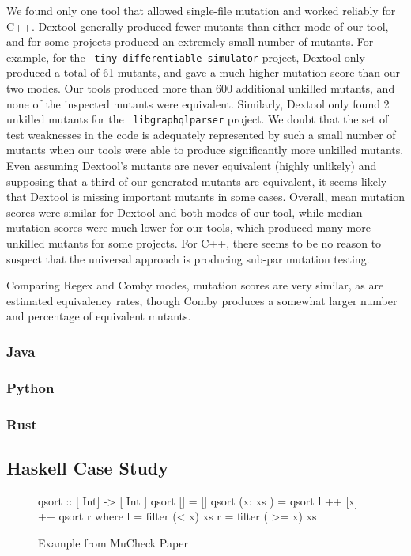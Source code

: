 \documentclass[sigconf,review, anonymous]{acmart}
\begin{document}
{We found only one tool that allowed single-file mutation and worked
reliably for C++.  Dextool generally produced fewer mutants than
either mode of our tool, and for some projects produced an extremely
small number of mutants.  For example, for the {\tt
  tiny-differentiable-simulator} project, Dextool only produced a
total of 61 mutants, and gave a much higher mutation score than our
two modes.  Our tools produced more than 600 additional unkilled
mutants, and none of the inspected mutants were equivalent.
Similarly, Dextool only found 2 unkilled mutants for the {\tt
  libgraphqlparser} project.  We doubt that the set of test weaknesses
in the code is adequately represented by such a small number of
mutants when our tools were able to produce significantly more
unkilled mutants.  Even assuming Dextool's mutants are never
equivalent (highly unlikely) and supposing that a third of our
generated mutants are equivalent, it seems likely that Dextool is
missing important mutants in some cases.  Overall, mean mutation
scores were similar for Dextool and both modes of our tool, while
median mutation scores were much lower for our tools, which produced
many more unkilled mutants for some projects.  For C++, there seems to
be no reason to suspect that the universal approach is producing
sub-par mutation testing.

Comparing Regex and Comby modes, mutation scores are very similar, as
are estimated equivalency rates, though Comby produces a somewhat
larger number and percentage of equivalent mutants.  

\subsubsection{Java}

\subsubsection{Python}

\subsubsection{Rust}

\subsection{Haskell Case Study}

\begin{figure}

  \begin{code}
 qsort :: [ Int] -> [ Int ]
 qsort [] = []
 qsort (x: xs ) = qsort l ++ [x] ++ qsort r
     where l = filter (< x) xs
           r = filter ( >= x) xs
\end{code}
\caption{Example from MuCheck Paper}
\label{fig:haskell}


\end{figure}}
\end{document}
